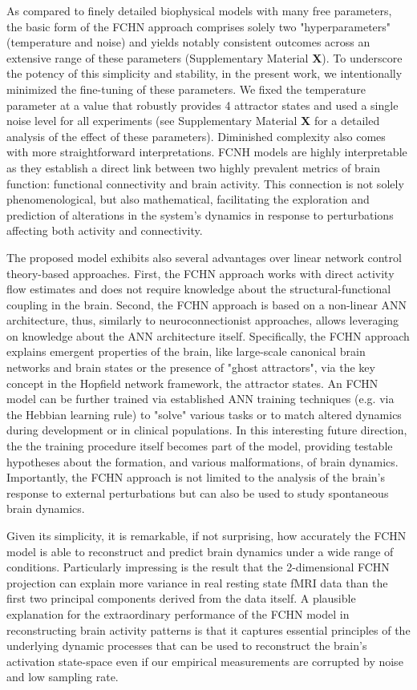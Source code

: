 \documentclass{article}
\begin{document}
As compared to finely detailed biophysical models with many free parameters, the basic form of the FCHN approach comprises solely two "hyperparameters" (temperature and noise) and yields notably consistent outcomes across an extensive range of these parameters (Supplementary Material \textbf{X}). To underscore the potency of this simplicity and stability, in the present work, we intentionally minimized the fine-tuning of these parameters. We fixed the temperature parameter at a value that robustly provides 4 attractor states and used a single noise level for all experiments (see Supplementary Material \textbf{X} for a detailed analysis of the effect of these parameters). Diminished complexity also comes with more straightforward interpretations. FCNH models are highly interpretable as they establish a direct link between two highly prevalent metrics of brain function: functional connectivity and brain activity. This connection is not solely phenomenological, but also mathematical, facilitating the exploration and prediction of alterations in the system's dynamics in response to perturbations affecting both activity and connectivity.

The proposed model exhibits also several advantages over linear network control theory-based \citep{gu2015controllability} approaches. First, the FCHN approach works with direct activity flow estimates and does not require knowledge about the structural-functional coupling in the brain. Second, the FCHN approach is based on a non-linear ANN architecture, thus, similarly to neuroconnectionist approaches, allows leveraging on knowledge about the ANN architecture itself. Specifically, the FCHN approach explains emergent properties of the brain, like large-scale canonical brain networks and brain states or the presence of "ghost attractors", via the key concept in the Hopfield network framework, the attractor states. An FCHN model can be further trained via established ANN training techniques (e.g. via the Hebbian learning rule) to "solve" various tasks or to match altered dynamics during development or in clinical populations. In this interesting future direction, the the training procedure itself becomes part of the model, providing testable hypotheses about the formation, and various malformations, of brain dynamics.
Importantly, the FCHN approach is not limited to the analysis of the brain's response to external perturbations but can also be used to study spontaneous brain dynamics.

Given its simplicity, it is remarkable, if not surprising, how accurately the FCHN model is able to
reconstruct and predict brain dynamics under a wide range of conditions. Particularly impressing is the result
that the 2-dimensional FCHN projection can explain more variance in real resting state fMRI data than the first two principal components derived from the data itself.
A plausible explanation for the extraordinary performance of the FCHN model in reconstructing brain activity patterns is that it captures essential principles of the underlying dynamic processes that can be used to reconstruct the brain's activation state-space even if our empirical measurements are corrupted by noise and low sampling rate.
\end{document}
